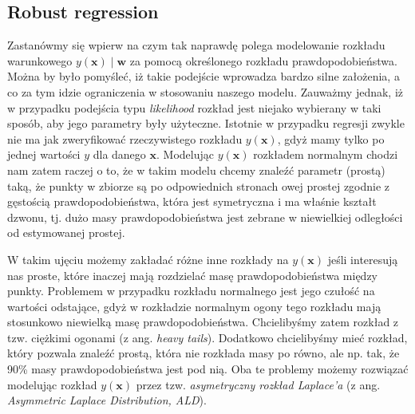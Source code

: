 \documentclass{myclass}
\numberwithin{equation}{subsection}
\begin{document}
\subsection{Robust regression}

Zastanówmy się wpierw na czym tak naprawdę polega modelowanie rozkładu warunkowego \(y(\bm{x}) \mid
\bm{w}\) za pomocą określonego rozkładu prawdopodobieństwa. Można by było pomyśleć, iż takie
podejście wprowadza bardzo silne założenia, a co za tym idzie ograniczenia w stosowaniu naszego
modelu. Zauważmy jednak, iż w przypadku podejścia typu \textit{likelihood} rozkład jest niejako
wybierany w taki sposób, aby jego parametry były użyteczne. Istotnie w przypadku regresji zwykle nie
ma jak zweryfikować rzeczywistego rozkładu \(y(\bm{x})\), gdyż mamy tylko po jednej wartości \(y\)
dla danego \(\bm{x}\). Modelując \(y(\bm{x})\) rozkładem normalnym chodzi nam zatem raczej o to, że
w takim modelu chcemy znaleźć parametr (prostą) taką, że punkty w zbiorze są po odpowiednich
stronach owej prostej zgodnie z gęstością prawdopodobieństwa, która jest symetryczna i ma właśnie
kształt dzwonu, tj. dużo masy prawdopodobieństwa jest zebrane w niewielkiej odległości od
estymowanej prostej.

W takim ujęciu możemy zakładać różne inne rozkłady na \(y(\bm{x})\) jeśli interesują nas proste,
które inaczej mają rozdzielać masę prawdopodobieństwa między punkty. Problemem w przypadku rozkładu
normalnego jest jego czułość na wartości odstające, gdyż w rozkładzie normalnym ogony tego rozkładu
mają stosunkowo niewielką masę prawdopodobieństwa. Chcielibyśmy zatem rozkład z tzw. ciężkimi
ogonami (z ang. \textit{heavy tails}). Dodatkowo chcielibyśmy mieć rozkład, który pozwala znaleźć
prostą, która nie rozkłada masy po równo, ale np. tak, że 90\% masy prawdopodobieństwa jest pod nią.
Oba te problemy możemy rozwiązać modelując rozkład \(y(\bm{x})\) przez tzw. \emph{asymetryczny
rozkład Laplace'a} (z ang. \textit{Asymmetric Laplace Distribution, ALD}).
\end{document}
